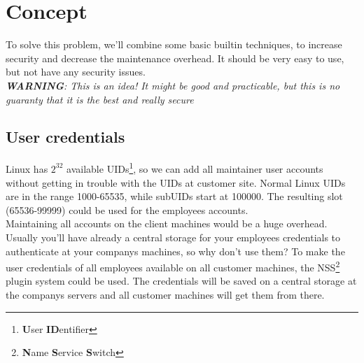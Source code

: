 %
%
%
%
%
%
%


\section{Concept}

To solve this problem, we'll combine some basic builtin techniques, to
increase security and decrease the maintenance overhead. It should be very easy
to use, but not have any security issues. \\

\textit{\textbf{WARNING}: This is an idea! It might be good and practicable, but
this is no guaranty that it is the best and really secure}


\subsection{User credentials}

Linux has $2^{32}$ available UIDs\footnote{\textbf{U}ser \textbf{ID}entifier},
so we can add all maintainer user accounts without getting in trouble with the
UIDs at customer site. Normal Linux UIDs are in the range 1000-65535, while
subUIDs start at 100000. The resulting slot (65536-99999) could be used for
the employees accounts. \\

Maintaining all accounts on the client machines would be a huge overhead.
Usually you'll have already a central storage for your employees credentials to
authenticate at your companys machines, so why don't use them? To make the user
credentials of all employees available on all customer machines, the
NSS\footnote{\textbf{N}ame \textbf{S}ervice \textbf{S}witch} plugin system could
be used. The credentials will be saved on a central storage at the companys
servers and all customer machines will get them from there. \\

